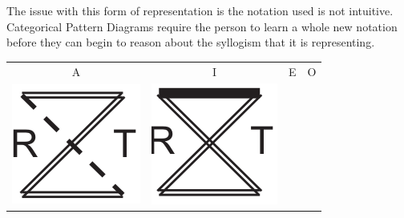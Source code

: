 \documentclass[12pt,a4paper]{report}
\begin{document}
The issue with this form of representation is the notation used is not intuitive. Categorical Pattern Diagrams require the person to learn a whole new notation before they can begin to reason about the syllogism that it is representing.

\begin{table}[h!]
  \centering
  \begin{tabular}{  c  c  c  c }
    A & I & E & O\\
    \begin{minipage}{.22\textwidth}
      \includegraphics[width=\linewidth, scale=0.5]{CPDA}
    \end{minipage}
    &
    \begin{minipage}{.22\textwidth}
      \includegraphics[width=\linewidth, scale=0.5]{CPDI}

\end{minipage}
\end{tabular}
\end{table}
\end{document}
